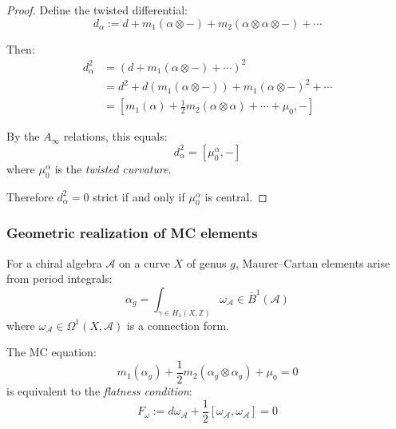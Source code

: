 \begin{proof}
Define the twisted differential:
\[d_\alpha := d + m_1(\alpha \otimes -) + m_2(\alpha \otimes \alpha \otimes -) + \cdots\]

Then:
\begin{align}
d_\alpha^2 &= (d + m_1(\alpha \otimes -) + \cdots)^2 \\
&= d^2 + d(m_1(\alpha \otimes -)) + m_1(\alpha \otimes -)^2 + \cdots \\
&= [m_1(\alpha) + \frac{1}{2}m_2(\alpha \otimes \alpha) + \cdots + \mu_0, -]
\end{align}

By the $A_\infty$ relations, this equals:
\[d_\alpha^2 = [\mu_0^\alpha, -]\]
where $\mu_0^\alpha$ is the \emph{twisted curvature}.

Therefore $d_\alpha^2 = 0$ strict if and only if $\mu_0^\alpha$ is central.
\end{proof}

\subsubsection{Geometric realization of MC elements}

\begin{theorem}\label{thm:mc-periods-DISABLED}
For a chiral algebra $\mathcal{A}$ on a curve $X$ of genus $g$, Maurer--Cartan elements arise
from period integrals:
\begin{equation}
\alpha_g = \int_{\gamma \in H_1(X, \mathbb{Z})} \omega_{\mathcal{A}} \in \bar{B}^1(\mathcal{A})
\end{equation}
where $\omega_{\mathcal{A}} \in \Omega^1(X, \mathcal{A})$ is a connection form.

The MC equation:
\begin{equation}
m_1(\alpha_g) + \frac{1}{2}m_2(\alpha_g \otimes \alpha_g) + \mu_0 = 0
\end{equation}
is equivalent to the \emph{flatness condition}:
\begin{equation}
F_{\omega} := d\omega_{\mathcal{A}} + \frac{1}{2}[\omega_{\mathcal{A}}, \omega_{\mathcal{A}}] = 0
\end{equation}
\end{theorem}


